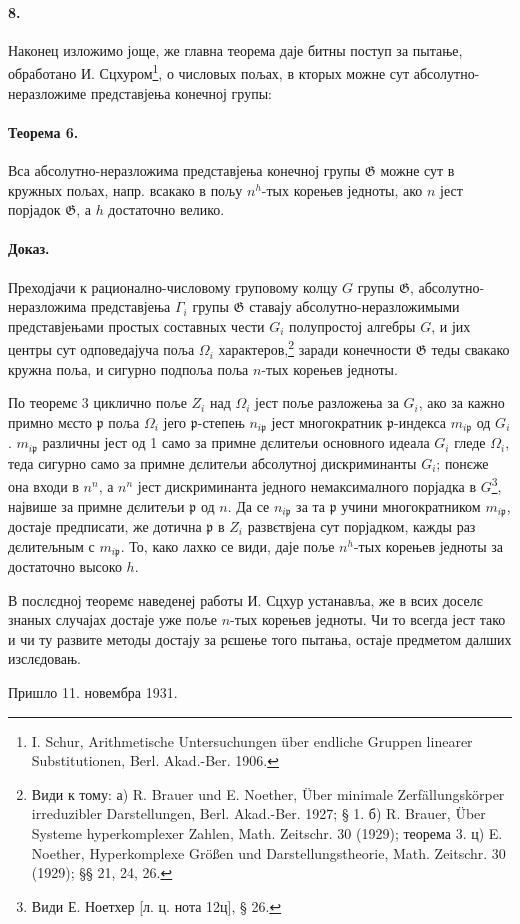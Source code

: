 \documentclass[11pt]{article}
\newcommand{\foreign}[1]{#1}
\begin{document}
\paragraph{8.}
Наконец изложимо јоще, же главна теорема даје битны поступ за пытање, обработано И. Сцхуром\footnote{\foreign{I. Schur, Arithmetische Untersuchungen über endliche Gruppen linearer Substitutionen, Berl. Akad.-Ber. 1906}.}, о числовых пољах, в кторых можне сут абсолутно-неразложиме представјења конечној групы:

\paragraph{Теорема 6.}
Вса абсолутно-неразложима представјења конечној групы \(\mathfrak G\) можне сут в кружных пољах, напр. всакако в пољу \(n^h\)-тых корењев једноты, ако \(n\) јест порјадок \(\mathfrak G\), а \(h\) достаточно велико.

\paragraph{Доказ.}
Преходјачи к рационално-числовому груповому колцу \(G\) групы \(\mathfrak G\), абсолутно-неразложима представјења \(\Gamma_i\) групы \(\mathfrak G\) ставају абсолутно-неразложимыми представјењами простых составных чести \(G_i\) полупростој алгебры \(G\), и јих центры сут одповедајуча поља \(\Omega_i\) характеров,\footnote{Види к тому: а) \foreign{R. Brauer und E. Noether, Über minimale Zerfällungskörper irreduzibler Darstellungen, Berl. Akad.-Ber. 1927; § 1.} б) \foreign{R. Brauer, Über Systeme hyperkomplexer Zahlen, Math. Zeitschr. 30 (1929);} теорема 3. ц) \foreign{E. Noether, Hyperkomplexe Größen und Darstellungstheorie, Math. Zeitschr. 30 (1929); §§ 21, 24, 26.}} заради конечности \(\mathfrak G\) теды свакако кружна поља, и сигурно подпоља поља \(n\)-тых корењев једноты.

По теоремє 3 циклично поље \(Z_i\) над \(\Omega_i\) јест поље разложења за \(G_i\), ако за кажно примно мєсто \(\mathfrak p\) поља \(\Omega_i\) јего \( \mathfrak p\)-степењ \(n_{i\mathfrak p}\) јест многократник \( \mathfrak p\)-индекса \(m_{i\mathfrak p}\) од \(G_i\). \(m_{i\mathfrak p}\) различны јест од 1 само за примне дєлитељи основного идеала \(G_i\) гледе \(\Omega_i\), теда сигурно само за примне дєлитељи абсолутној дискриминанты \(G_i\); понєже она входи в \(n^n\), а \(n^n\) јест дискриминанта једного немаксималного порјадка в \(G\)\footnote{Види Е. Ноетхер [л. ц. нота 12ц], § 26.}, највише за примне дєлитељи \(\mathfrak p\) од \(n\). Да се \(n_{i\mathfrak p}\) за та \(\mathfrak p\) учини многократником \(m_{i\mathfrak p}\), достаје предписати, же дотична \(\mathfrak p\) в \(Z_i\) развєтвјена сут порјадком, кажды раз дєлитељным с \(m_{i\mathfrak p}\). То, како лахко се види, даје поље \(n^h\)-тых корењев једноты за достаточно высоко \(h\).

В послєдној теоремє наведенеј работы И. Сцхур устанавља, же в всих доселє знаных случајах достаје уже поље \(n\)-тых корењев једноты. Чи то всегда јест тако и чи ту развите методы достају за рєшење того пытања, остаје предметом далших изслєдовањ.

\begin{center}
Пришло 11. новембра 1931.
\end{center}
\end{document}
